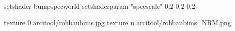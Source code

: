 setshader bumpspecworld
setshaderparam "specscale" 0.2 0.2 0.2

texture 0 arcitool/rohbaubims.jpg
texture n arcitool/rohbaubims_NRM.png
